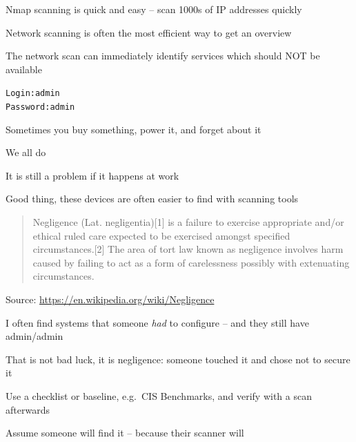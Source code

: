 \documentclass[Screen16to9,17pt]{foils}
\begin{document}
\begin{list2}
\item Nmap scanning is quick and easy -- scan 1000s of IP addresses quickly
\item Network scanning is often the most efficient way to get an overview
\item The network scan can immediately identify services which should NOT be available
\end{list2}




\begin{alltt}
Login: admin
Password: admin
\end{alltt}

\begin{list2}
\item Sometimes you buy something, power it, and forget about it
\item We all do
\item It is still a problem if it happens at work
\item Good thing, these devices are often easier to find with scanning tools
\end{list2}




\begin{quote}
Negligence (Lat. negligentia)[1] is a failure to exercise appropriate and/or ethical ruled care expected to be exercised amongst specified circumstances.[2] The area of tort law known as negligence involves harm caused by failing to act as a form of carelessness possibly with extenuating circumstances.
\end{quote}
Source: \url{https://en.wikipedia.org/wiki/Negligence}


\begin{list2}
\item I often find systems that someone \emph{had} to configure -- and they still have admin/admin
\item That is not bad luck, it is negligence: someone touched it and chose not to secure it
\item Use a checklist or baseline, e.g.\ CIS Benchmarks, and verify with a scan afterwards
\item Assume someone will find it -- because their scanner will
\end{list2}
\end{document}
